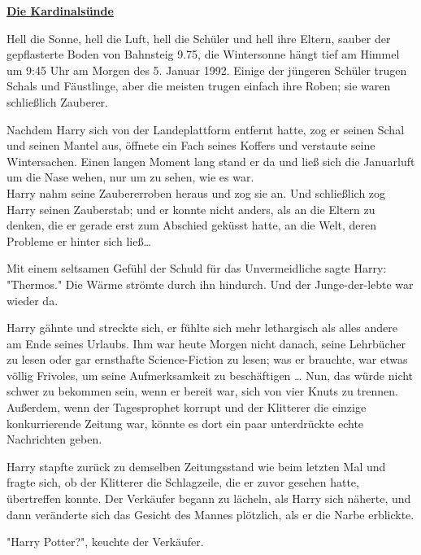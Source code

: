 

\hypertarget{die-kardinalsuxfcnde}{%

\textbf{\uline{Die Kardinalsünde}}

Hell die Sonne, hell die Luft, hell die Schüler und hell ihre Eltern, sauber der gepflasterte Boden von Bahnsteig 9.75, die Wintersonne hängt tief am Himmel um 9:45 Uhr am Morgen des 5. Januar 1992. Einige der jüngeren Schüler trugen Schals und Fäustlinge, aber die meisten trugen einfach ihre Roben; sie waren schließlich Zauberer.

Nachdem Harry sich von der Landeplattform entfernt hatte, zog er seinen Schal und seinen Mantel aus, öffnete ein Fach seines Koffers und verstaute seine Wintersachen. Einen langen Moment lang stand er da und ließ sich die Januarluft um die Nase wehen, nur um zu sehen, wie es war.\\ Harry nahm seine Zaubererroben heraus und zog sie an. Und schließlich zog Harry seinen Zauberstab; und er konnte nicht anders, als an die Eltern zu denken, die er gerade erst zum Abschied geküsst hatte, an die Welt, deren Probleme er hinter sich ließ…

Mit einem seltsamen Gefühl der Schuld für das Unvermeidliche sagte Harry: "Thermos." Die Wärme strömte durch ihn hindurch. Und der Junge-der-lebte war wieder da.

Harry gähnte und streckte sich, er fühlte sich mehr lethargisch als alles andere am Ende seines Urlaubs. Ihm war heute Morgen nicht danach, seine Lehrbücher zu lesen oder gar ernsthafte Science-Fiction zu lesen; was er brauchte, war etwas völlig Frivoles, um seine Aufmerksamkeit zu beschäftigen … Nun, das würde nicht schwer zu bekommen sein, wenn er bereit war, sich von vier Knuts zu trennen. Außerdem, wenn der Tagesprophet korrupt und der Klitterer die einzige konkurrierende Zeitung war, könnte es dort ein paar unterdrückte echte Nachrichten geben.

Harry stapfte zurück zu demselben Zeitungsstand wie beim letzten Mal und fragte sich, ob der Klitterer die Schlagzeile, die er zuvor gesehen hatte, übertreffen konnte. Der Verkäufer begann zu lächeln, als Harry sich näherte, und dann veränderte sich das Gesicht des Mannes plötzlich, als er die Narbe erblickte.

"Harry Potter?", keuchte der Verkäufer.

}
